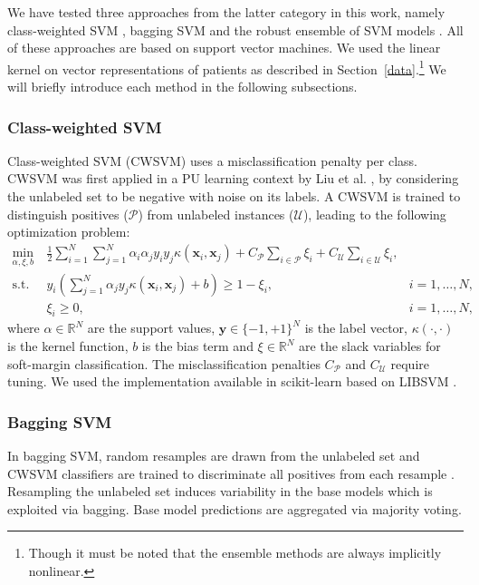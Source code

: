 We have tested three approaches from the latter category in this work, namely class-weighted SVM \citep{Liu:2003:BTC:951949.952139}, bagging SVM \citep{mordelet2014bagging} and the robust ensemble of SVM models \citep{Claesen2015resvm}. All of these approaches are based on support vector machines. We used the linear kernel on vector representations of patients as described in Section~\ref{data}.\footnote{Though it must be noted that the ensemble methods are always implicitly nonlinear.} We will briefly introduce each method in the following subsections.

\subsubsection{Class-weighted SVM} \label{bsvm}
Class-weighted SVM (CWSVM) uses a misclassification penalty per class. CWSVM was first applied in a PU learning context by Liu et al. \citep{Liu:2003:BTC:951949.952139}, by considering the unlabeled set to be negative with noise on its labels. A CWSVM is trained to distinguish positives ($\mathcal{P}$) from unlabeled instances ($\mathcal{U}$), leading to the following optimization problem:
\begin{align}
\min_{\alpha,\xi,b}\ & \frac{1}{2}\sum_{i=1}^N\sum_{j=1}^N \alpha_i\alpha_j y_i y_j \kappa(\mathbf{x}_i,\mathbf{x}_j)+C_{\mathcal{P}}\sum_{i \in\mathcal{P}} \xi_i + C_{\mathcal{U}}\sum_{i\in\mathcal{U}} \xi_i, \label{eq:bsvm} \\
\text{s.t. } &y_i(\sum_{j=1}^N \alpha_j y_j \kappa(\mathbf{x}_i,\mathbf{x}_j)+b)\geq 1-\xi_i, &i=1,\ldots,N, \nonumber \\
&\xi_i \geq 0, &i=1,\ldots,N, \nonumber
\end{align}
where $\alpha \in \mathbb{R}^N$ are the support values, $\mathbf{y} \in \{-1,+1\}^N$ is the label vector, $\kappa(\cdot,\cdot)$ is the kernel function, $b$ is the bias term and $\xi \in \mathbb{R}^N$ are the slack variables for soft-margin classification. The misclassification penalties $C_{\mathcal{P}}$ and $C_{\mathcal{U}}$ require tuning. We used the implementation available in scikit-learn \citep{pedregosa2011scikit} based on LIBSVM \citep{CC01a}.

\subsubsection{Bagging SVM} \label{baggingsvm}
In bagging SVM, random resamples are drawn from the unlabeled set and CWSVM classifiers are trained to discriminate all positives from each resample \citep{mordelet2014bagging}. Resampling the unlabeled set induces variability in the base models which is exploited via bagging. Base model predictions are aggregated via majority voting.

